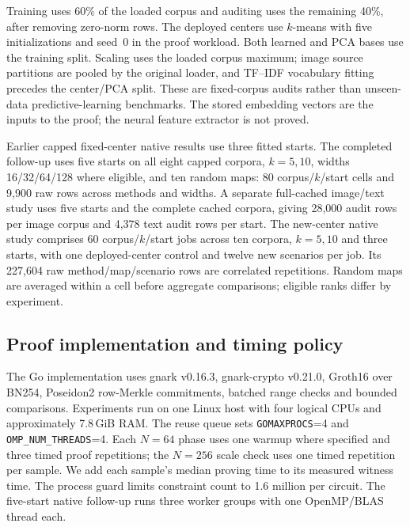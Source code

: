 \documentclass[5p,times,twocolumn]{elsarticle}
\theoremstyle{plain}
\theoremstyle{definition}
\theoremstyle{remark}
\begin{document}
\par\endgroup
\begingroup\color{RevisionRed}
Training uses 60\% of the loaded corpus and auditing uses the remaining 40\%, after removing zero-norm rows. The deployed centers use $k$-means with five initializations and seed~0 in the proof workload. Both learned and PCA bases use the training split. Scaling uses the loaded corpus maximum; image source partitions are pooled by the original loader, and TF--IDF vocabulary fitting precedes the center/PCA split. These are fixed-corpus audits rather than unseen-data predictive-learning benchmarks. The stored embedding vectors are the inputs to the proof; the neural feature extractor is not proved.


\par\endgroup
\begingroup\color{RevisionRed}
Earlier capped fixed-center native results use three fitted starts. The completed follow-up uses five starts on all eight capped corpora, $k=5,10$, widths 16/32/64/128 where eligible, and ten random maps: 80 corpus/$k$/start cells and 9,900 raw rows across methods and widths. A separate full-cached image/text study uses five starts and the complete cached corpora, giving 28,000 audit rows per image corpus and 4,378 text audit rows per start. The new-center native study comprises 60 corpus/$k$/start jobs across ten corpora, $k=5,10$ and three starts, with one deployed-center control and twelve new scenarios per job. Its 227,604 raw method/map/scenario rows are correlated repetitions. Random maps are averaged within a cell before aggregate comparisons; eligible ranks differ by experiment.


\par\endgroup
\subsection{\textcolor{RevisionRed}{Proof implementation and timing policy}}\label{sec:implementation}
\begingroup\color{RevisionRed}
The Go implementation uses gnark v0.16.3, gnark-crypto v0.21.0, Groth16 over BN254, Poseidon2 row-Merkle commitments, batched range checks and bounded comparisons. Experiments run on one Linux host with four logical CPUs and approximately 7.8\,GiB RAM. The reuse queue sets \texttt{GOMAXPROCS}=4 and \texttt{OMP\_NUM\_THREADS}=4. Each $N=64$ phase uses one warmup where specified and three timed proof repetitions; the $N=256$ scale check uses one timed repetition per sample. We add each sample's median proving time to its measured witness time. The process guard limits constraint count to 1.6 million per circuit. The five-start native follow-up runs three worker groups with one OpenMP/BLAS thread each.
\end{document}
